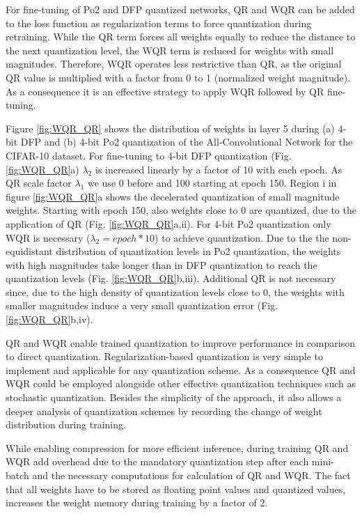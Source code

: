 For fine-tuning of Po2 and DFP quantized networks, QR and WQR can be added to the loss function as regularization terms to force quantization during retraining. While the QR term forces all weights equally to reduce the distance to the next quantization level, the WQR term is reduced for weights with small magnitudes. Therefore, WQR operates less restrictive than QR, as the original QR value is multiplied with a factor from 0 to 1 (normalized weight magnitude). As a consequence it is an effective strategy to apply WQR followed by QR fine-tuning.

Figure \ref{fig:WQR_QR} shows the distribution of weights in layer 5 during (a) 4-bit DFP and (b) 4-bit Po2 quantization of the All-Convolutional Network for the CIFAR-10 dataset. For fine-tuning to 4-bit DFP quantization (Fig.\ref{fig:WQR_QR}a) $\lambda_2$ is increased linearly by a factor of 10 with each epoch. As QR scale factor $\lambda_1$ we use 0 before and 100 starting at epoch 150. Region i in figure \ref{fig:WQR_QR}a shows the decelerated quantization of small magnitude weights. Starting with epoch 150, also weights close to 0 are quantized, due to the application of QR (Fig. \ref{fig:WQR_QR}a,ii). For 4-bit Po2 quantization only WQR is necessary ($\lambda_2 = epoch*10$) to achieve quantization. Due to the the non-equidistant distribution of quantization levels in Po2 quantization, the weights with high magnitudes take longer than in DFP quantization to reach the quantization levels (Fig. \ref{fig:WQR_QR}b,iii). Additional QR is not necessary since, due to the high density of quantization levels close to 0, the weights with smaller magnitudes induce a very small quantization error (Fig. \ref{fig:WQR_QR}b,iv).

QR and WQR enable trained quantization to improve performance in comparison to direct quantization. Regularization-based quantization is very simple to implement and applicable for any quantization scheme. As a consequence QR and WQR could be employed alongside other effective quantization techniques such as stochastic quantization. Besides the simplicity of the approach, it also allows a deeper analysis of quantization schemes by recording the change of weight distribution during training.

While enabling compression for more efficient inference, during training QR and WQR add overhead due to the mandatory quantization step after each mini-batch and the necessary computations for calculation of QR and WQR. The fact that all weights have to be stored as floating point values and quantized values, increases the weight memory during training by a factor of 2.


